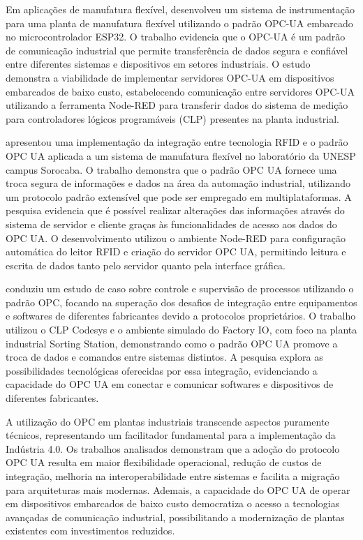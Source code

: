 Em aplicações de manufatura flexível, \cite{silva2023} desenvolveu um sistema de instrumentação para uma planta de manufatura flexível utilizando o padrão OPC-UA embarcado no microcontrolador ESP32. O trabalho evidencia que o OPC-UA é um padrão de comunicação industrial que permite transferência de dados segura e confiável entre diferentes sistemas e dispositivos em setores industriais. O estudo demonstra a viabilidade de implementar servidores OPC-UA em dispositivos embarcados de baixo custo, estabelecendo comunicação entre servidores OPC-UA utilizando a ferramenta Node-RED para transferir dados do sistema de medição para controladores lógicos programáveis (CLP) presentes na planta industrial.

\cite{petrocchi2024} apresentou uma implementação da integração entre tecnologia RFID e o padrão OPC UA aplicada a um sistema de manufatura flexível no laboratório da UNESP campus Sorocaba. O trabalho demonstra que o padrão OPC UA fornece uma troca segura de informações e dados na área da automação industrial, utilizando um protocolo padrão extensível que pode ser empregado em multiplataformas. A pesquisa evidencia que é possível realizar alterações das informações através do sistema de servidor e cliente graças às funcionalidades de acesso aos dados do OPC UA. O desenvolvimento utilizou o ambiente Node-RED para configuração automática do leitor RFID e criação do servidor OPC UA, permitindo leitura e escrita de dados tanto pelo servidor quanto pela interface gráfica.

\cite{souza2024} conduziu um estudo de caso sobre controle e supervisão de processos utilizando o padrão OPC, focando na superação dos desafios de integração entre equipamentos e softwares de diferentes fabricantes devido a protocolos proprietários. O trabalho utilizou o CLP Codesys e o ambiente simulado do Factory IO, com foco na planta industrial Sorting Station, demonstrando como o padrão OPC UA promove a troca de dados e comandos entre sistemas distintos. A pesquisa explora as possibilidades tecnológicas oferecidas por essa integração, evidenciando a capacidade do OPC UA em conectar e comunicar softwares e dispositivos de diferentes fabricantes.

A utilização do OPC em plantas industriais transcende aspectos puramente técnicos, representando um facilitador fundamental para a implementação da Indústria 4.0. Os trabalhos analisados demonstram que a adoção do protocolo OPC UA resulta em maior flexibilidade operacional, redução de custos de integração, melhoria na interoperabilidade entre sistemas e facilita a migração para arquiteturas mais modernas. Ademais, a capacidade do OPC UA de operar em dispositivos embarcados de baixo custo democratiza o acesso a tecnologias avançadas de comunicação industrial, possibilitando a modernização de plantas existentes com investimentos reduzidos.

